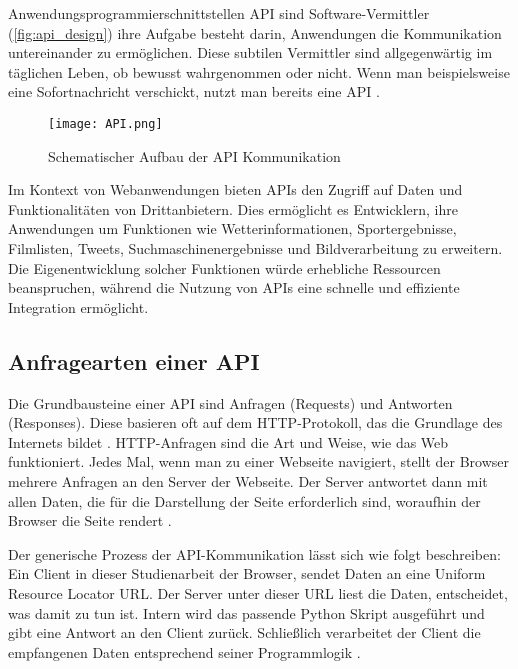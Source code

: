 Anwendungsprogrammierschnittstellen \ac{API} sind Software-Vermittler (\autoref{fig:api_design}) ihre Aufgabe besteht darin, Anwendungen die Kommunikation untereinander zu ermöglichen. 
Diese subtilen Vermittler sind allgegenwärtig im täglichen Leben, ob bewusst wahrgenommen oder nicht. 
Wenn man beispielsweise eine Sofortnachricht verschickt, nutzt man bereits eine \ac{API} \cite{pykes_programmieren_nodate}.

\begin{figure}[h]
    \centering
    \texttt{[image: API.png]}
    \caption{Schematischer Aufbau der API Kommunikation}
    \label{fig:api_design}
\end{figure}

Im Kontext von Webanwendungen bieten \ac{API}s den Zugriff auf Daten und Funktionalitäten von Drittanbietern. 
Dies ermöglicht es Entwicklern, ihre Anwendungen um Funktionen wie Wetterinformationen, Sportergebnisse, Filmlisten, Tweets, Suchmaschinenergebnisse und Bildverarbeitung zu erweitern. 
Die Eigenentwicklung solcher Funktionen würde erhebliche Ressourcen beanspruchen, während die Nutzung von APIs eine schnelle und effiziente Integration ermöglicht\cite{digital_ocean_llc_erste_nodate}.

\subsection{Anfragearten einer API} \label{subsec:anfragearten_einer_api}  %

Die Grundbausteine einer \Ac{API} sind Anfragen (Requests) und Antworten (Responses). Diese basieren oft auf dem \ac{HTTP}-Protokoll, das die Grundlage des Internets bildet \cite{software_mittelstand_erste_nodate}. 
\ac{HTTP}-Anfragen sind die Art und Weise, wie das Web funktioniert. Jedes Mal, wenn man zu einer Webseite navigiert, stellt der Browser mehrere Anfragen an den Server der Webseite. Der Server antwortet dann mit allen Daten, die für die Darstellung der Seite erforderlich sind, woraufhin der Browser die Seite rendert \cite{digital_ocean_llc_erste_nodate}.

Der generische Prozess der \Ac{API}-Kommunikation lässt sich wie folgt beschreiben: Ein Client in dieser Studienarbeit der Browser, sendet Daten an eine Uniform Resource Locator \ac{URL}. Der Server unter dieser \ac{URL} liest die Daten, entscheidet, was damit zu tun ist. Intern wird das passende Python Skript ausgeführt und gibt eine Antwort an den Client zurück. Schließlich verarbeitet der Client die empfangenen Daten entsprechend seiner Programmlogik \cite{digital_ocean_llc_erste_nodate}.

